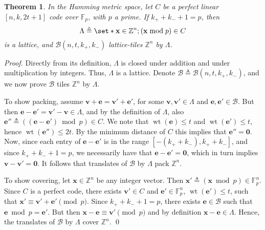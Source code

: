 \documentclass[sort&compress]{elsarticle}
\newcommand{\cB}{\mathcal{B}}
\newcommand{\cG}{\mathcal{G}}
\renewcommand{\leq}{\leqslant}
\newtheorem{theorem}{Theorem}
\newtheorem{corollary}{Corollary}
\newcommand{\F}{\mathbb{F}}
\newcommand{\Z}{\mathbb{Z}}
\newcommand{\ve}{\mathbf{e}}
\newcommand{\vv}{\mathbf{v}}
\newcommand{\vx}{\mathbf{x}}
\newcommand{\Zero}{{\mathbf{0}}}
\DeclareMathOperator{\wt}{wt}
\newcommand{\kp}{k_+}
\newcommand{\km}{k_-}
\newcommand{\eqdef}{\triangleq}
\begin{document}





\begin{theorem}
  \label{th:perfectcode}
  In the Hamming metric space, let $C$ be a perfect linear
  $[n,k,2t+1]$ code over $\F_p$, with $p$ a prime. If $\kp+\km+1=p$,
  then
  \[ \Lambda\eqdef \set*{ \vx\in\Z^n ; (\vx\bmod p)\in C}\]
  is a lattice, and $\cB(n,t,\kp,\km)$ lattice-tiles $\Z^n$ by
  $\Lambda$.
\end{theorem}
\begin{proof}
  Directly from its definition, $\Lambda$ is closed under addition and
  under multiplication by integers. Thus, $\Lambda$ is a
  lattice. Denote $\cB\eqdef\cB(n,t,\kp,\km)$, and we now prove $\cB$
  tiles $\Z^n$ by $\Lambda$.

  To show packing, assume $\vv+\ve=\vv'+\ve'$, for some
  $\vv,\vv'\in\Lambda$ and $\ve,\ve'\in\cB$. But then
  $\ve-\ve'=\vv'-\vv\in\Lambda$, and by the definition of $\Lambda$,
  also $\ve''\eqdef ((\ve-\ve')\bmod p)\in C$. We note that
  $\wt(\ve)\leq t$ and $\wt(\ve')\leq t$, hence $\wt(\ve'')\leq
  2t$. By the minimum distance of $C$ this implies that
  $\ve''=\Zero$. Now, since each entry of $\ve-\ve'$ is in the range
  $[-(\kp+\km),\kp+\km]$, and since $\kp+\km+1=p$, we necessarily have
  that $\ve-\ve'=\Zero$, which in turn implies $\vv-\vv'=\Zero$. It
  follows that translates of $\cB$ by $\Lambda$ pack $\Z^n$.

  To show covering, let $\vx\in\Z^n$ be any integer vector. Then
  $\vx'\eqdef(\vx\bmod p)\in\F_p^n$. Since $C$ is a perfect code,
  there exists $\vv'\in C$ and $\ve'\in\F_p^n$, $\wt(\ve')\leq t$,
  such that $\vx'\equiv \vv'+\ve'\pmod{p}$. Since $\kp+\km+1=p$, there
  exists $\ve\in\cB$ such that $\ve\bmod p=\ve'$. But then
  $\vx-\ve\equiv \vv'\pmod{p}$ and by definition
  $\vx-\ve\in\Lambda$. Hence, the translates of $\cB$ by $\Lambda$
  cover $\Z^n$.  \qed\end{proof}
\end{document}
